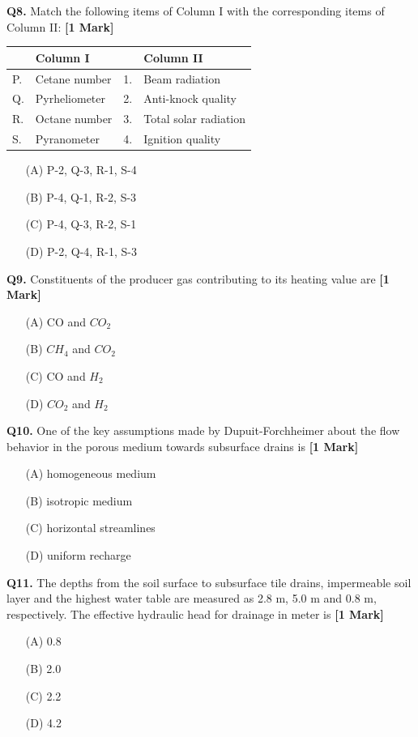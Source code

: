 \documentclass[11pt]{article}
\newcommand{\questiona}[2]{
    \noindent\textbf{Q#2.} #1 \hfill \textbf{[1 Mark]}
}
\begin{document}
\questiona{Match the following items of Column I with the corresponding items of Column II:}{8}
\begin{center}
\begin{tabular}{|l|l|l|l|}
\hline
 & Column I & & Column II \\
\hline
P. & Cetane number & 1. & Beam radiation \\
Q. & Pyrheliometer & 2. & Anti-knock quality \\
R. & Octane number & 3. & Total solar radiation \\
S. & Pyranometer & 4. & Ignition quality \\
\hline
\end{tabular}
\end{center}
\begin{enumerate}
    \item[(A)] P-2, Q-3, R-1, S-4  
    \item[(B)] P-4, Q-1, R-2, S-3  
    \item[(C)] P-4, Q-3, R-2, S-1  
    \item[(D)] P-2, Q-4, R-1, S-3  
\end{enumerate}
\vspace{0.5cm}

\questiona{Constituents of the producer gas contributing to its heating value are}{9}
\begin{enumerate}
    \item[(A)] CO and $CO_2$ 
    \item[(B)] $CH_4$ and $CO_2$  
    \item[(C)] CO and $H_2$  
    \item[(D)] $CO_2$ and $H_2$  
\end{enumerate}
\vspace{0.5cm}

\questiona{One of the key assumptions made by Dupuit-Forchheimer about the flow behavior in the porous medium towards subsurface drains is}{10}
\begin{enumerate}
    \item[(A)] homogeneous medium  
    \item[(B)] isotropic medium  
    \item[(C)] horizontal streamlines  
    \item[(D)] uniform recharge  
\end{enumerate}
\vspace{0.5cm}

\questiona{The depths from the soil surface to subsurface tile drains, impermeable soil layer and the highest water table are measured as 2.8 m, 5.0 m and 0.8 m, respectively. The effective hydraulic head for drainage in meter is}{11}
\begin{enumerate}
    \item[(A)] 0.8  
    \item[(B)] 2.0  
    \item[(C)] 2.2  
    \item[(D)] 4.2  
\end{enumerate}
\vspace{0.5cm}
\end{document}
